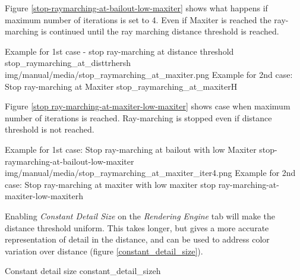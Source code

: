 Figure \ref{stop-raymarching-at-bailout-low-maxiter} shows what happens if maximum number of iterations is set to 4. Even if Maxiter is reached the
ray-marching is continued until the ray marching distance threshold is reached.

{Example for 1st case - stop ray-marching at distance threshold}
{stop_raymarching_at_disttrhersh}
{img/manual/media/stop_raymarching_at_maxiter.png}
{Example for 2nd case: Stop ray-marching at Maxiter}
{stop_raymarching_at_maxiter}{H}

Figure \ref{stop ray-marching-at-maxiter-low-maxiter} shows case when maximum number of iterations is reached. Ray-marching is stopped even
if distance threshold is not reached.

{Example for 1st case: Stop ray-marching at bailout with low Maxiter}
{stop-raymarching-at-bailout-low-maxiter}
{img/manual/media/stop_raymarching_at_maxiter_iter4.png}
{Example for 2nd case: Stop ray-marching at maxiter with low maxiter}
{stop ray-marching-at-maxiter-low-maxiter}{h}

Enabling \emph{Constant Detail Size} on the \emph{Rendering Engine} tab will make the distance threshold uniform. This takes longer, but gives a more accurate representation of detail in the distance, and can be used to address color variation over distance (figure \ref{constant_detail_size}).

{Constant detail size}
{constant_detail_size}{h}


